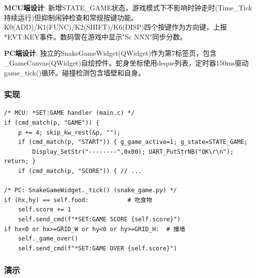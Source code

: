 \documentclass[12pt,hyperref,a4paper,UTF8]{ctexart}
\begin{document}
\textbf{MCU端设计}: 新增STATE\_GAME状态，游戏模式下不影响时钟走时(Time\_Tick持续运行)但抑制闹钟检查和常规按键功能。K0(ADD)/K1(FUNC)/K2(SHIFT)/K6(DISP)四个按键作为方向键，上报*EVT:KEY事件。数码管在游戏中显示"Sc NNN"同步分数。

\textbf{PC端设计}: 独立的SnakeGameWidget(QWidget)作为第7标签页，包含\_GameCanvas(QWidget)自绘控件。蛇身坐标使用deque列表，定时器150ms驱动game\_tick()循环。碰撞检测包含墙壁和自身。

\subsubsection{实现}

\begin{verbatim}
/* MCU: *SET:GAME handler (main.c) */
if (cmd_match(p, "GAME")) {
    p += 4; skip_kw_rest(&p, "");
    if (cmd_match(p, "START")) { g_game_active=1; g_state=STATE_GAME;
        Display_SetStr("--------",0x00); UART_PutStrNB("OK\r\n"); return; }
    if (cmd_match(p, "SCORE")) { // ...

/* PC: SnakeGameWidget._tick() (snake_game.py) */
if (hx,hy) == self.food:           # 吃食物
    self.score += 1
    self.send_cmd(f"*SET:GAME SCORE {self.score}")
if hx<0 or hx>=GRID_W or hy<0 or hy>=GRID_H:  # 撞墙
    self._game_over()
    self.send_cmd(f"*SET:GAME OVER {self.score}")
\end{verbatim}

\subsubsection{演示}
\end{document}
